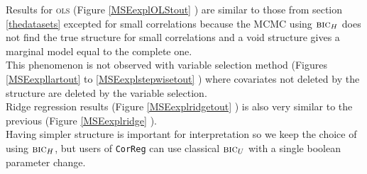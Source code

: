\documentclass[12pt,a4paper]{report}
\begin{document}
Results for \textsc{ols} (Figure \ref{MSEexplOLStout} ) are similar to those from section \ref{thedatasets} excepted for small correlations because the MCMC using $\mbox{{\sc bic}}_H$ does not find the true structure for small correlations and a void structure gives a marginal model equal to the complete one.  \\
 This phenomenon is not observed with variable selection method (Figures \ref{MSEexpllartout} to \ref{MSEexplstepwisetout} ) where covariates not deleted by the structure are deleted by the variable selection. \\
 Ridge regression results (Figure \ref{MSEexplridgetout} ) is also very similar to the previous (Figure \ref{MSEexplridge} ).\\
 
 Having simpler structure is important for interpretation so we keep the choice of using $\mbox{{\sc bic}}_H$, but users of {\tt CorReg} can use classical $\mbox{{\sc bic}}_U$ with a single boolean parameter change.

 
\FloatBarrier

\newpage
\end{document}
